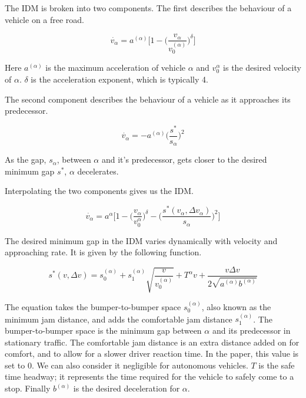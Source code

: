 The IDM is broken into two components. The first describes the behaviour of a vehicle on a free road.

\begin{equation}
\dot{v_\alpha} = a^{(\alpha)}\Biggl[1 - \biggl(\frac{v_\alpha}{v_0^{(\alpha)}}\biggr)^\delta\Biggr]
\end{equation}

Here $a^{(\alpha)}$ is the maximum acceleration of vehicle $\alpha$ and $v_0^{\alpha}$ is the desired velocity of $\alpha$. $\delta$ is the acceleration exponent, which is typically 4. 

The second component describes the behaviour of a vehicle as it approaches its predecessor. 

\begin{equation}
\dot{v_\alpha} = - a^{(\alpha)}\biggl(\frac{s^*}{s_\alpha}\biggr)^2
\end{equation}

As the gap, $s_\alpha$, between $\alpha$ and it's predecessor, gets closer to the desired minimum gap $s^*$, $\alpha$ decelerates.

Interpolating the two components gives us the IDM. 

\begin{equation}
\dot{v_\alpha} = a^{\alpha}\Biggl[1 - \biggl(\frac{v_\alpha}{v_0^\alpha}\biggr)^\delta - \biggl(\frac{s^*(v_\alpha,\Delta v_\alpha)}{s_\alpha}\biggr)^2\Biggr]
\end{equation}

The desired minimum gap in the IDM varies dynamically with velocity and approaching rate. It is given by the following function.

\begin{equation}\label{IDMSpacingFunction}
s^*(v,\Delta v) = s_0^{(\alpha)} + s_1^{(\alpha)}\sqrt{\frac{v}{v_0^{(\alpha)}}} + T^\alpha v + \frac{v\Delta v}{2\sqrt{a^{(\alpha)}b^{(\alpha)}}}
\end{equation}

The equation takes the bumper-to-bumper space $s_0^{(\alpha)}$, also known as the minimum jam distance, and adds the comfortable jam distance $s_1^{(\alpha)}$. The bumper-to-bumper space is the minimum gap between $\alpha$ and its predecessor in stationary traffic. The comfortable jam distance is an extra distance added on for comfort, and to allow for a slower driver reaction time. In the paper, this value is set to $0$. We can also consider it negligible for autonomous vehicles. $T$ is the safe time headway; it represents the time required for the vehicle to safely come to a stop. Finally $b^{(\alpha)}$ is the desired deceleration for $\alpha$.

